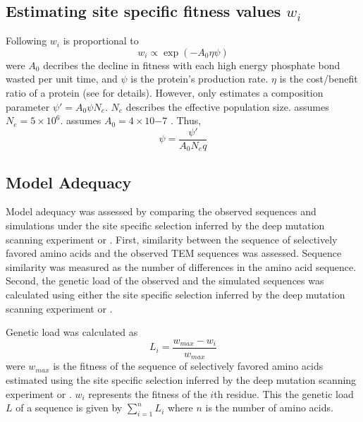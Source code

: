\documentclass[12pt]{article}
\begin{document}
\subsection*{Estimating site specific fitness values $w_i$}

Following \citet{beaulieu2018} $w_i$ is proportional to
\begin{equation}
w_i \propto \exp(-A_0\eta\psi)
\end{equation}
were $A_0$ decribes the decline in fitness with each high energy phosphate bond wasted per unit time, and $\psi$ is the protein's production rate.
$\eta$ is the cost/benefit ratio of a protein (see \citep{beaulieu2018} for details). 
However, \selac only estimates a composition parameter $\psi' = A_0\psi N_e$.
$N_e$ describes the effective population size.
\selac assumes $N_e = 5\times 10^6$.
\selac assumes $A_0 = 4 \times 10{-7}$ \citep{gilchrist2007}.
Thus, 
\begin{equation}
\psi = \frac{\psi'}{A_0N_eq}
\end{equation}


\subsection*{Model Adequacy}

Model adequacy was assessed by comparing the observed sequences and simulations under the site specific selection inferred by the deep mutation scanning experiment or \selac.
First, similarity between the sequence of selectively favored amino acids and the observed TEM sequences was assessed.
Sequence similarity was measured as the number of differences in the amino acid sequence.
Second, the genetic load of the observed and the simulated sequences was calculated using either the site specific selection inferred by the deep mutation scanning experiment or \selac.

Genetic load was calculated as
\begin{equation}
L_i = \frac{w_{max} - w_i}{w_{max}}
\end{equation}
were $w_{max}$ is the fitness of the sequence of selectively favored amino acids estimated using  the site specific selection inferred by the deep mutation scanning experiment or \selac.
$w_i$ represents the fitness of the $i$th residue.
This the genetic load $L$ of a sequence is given by $\sum_{i=1}^n L_i$ where $n$ is the number of amino acids.





\end{document}
